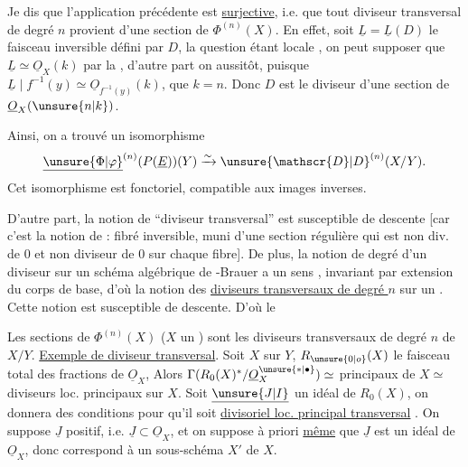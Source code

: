 Je dis que l'application précédente est \uline{surjective}, i.e. que tout diviseur transversal  de degré $n$ provient d'une section de $\Phi^{(n)}(X)$. En effet, soit $\underline{L}=\underline{L}(D)$ le faisceau inversible défini par
$D$,  la question étant locale , on peut supposer que $\underline{L}\simeq\underline{O}_X(k)$ par la , d'autre part on  aussitôt, puisque $\underline{L}\mid f^{-1}(y)\simeq\underline{O}_{f^{-1}(y)}(k)$, que $k=n$. Donc $D$ est le diviseur d'une section de $\underline{O}_X(\unsure{n|k})$.

Ainsi, on a  trouvé un isomorphisme 
\[
\underline{\unsure{\Phi|\varphi}}^{(n)}(P(\underline{E}))(Y)\xrightarrow{\sim}\unsure{\mathscr{D}|D}^{(n)}(X/Y).
\]
Cet isomorphisme est fonctoriel, compatible aux images inverses.

D'autre part, la notion de ``diviseur  transversal'' est susceptible de descente [car c'est la notion de : fibré inversible, muni d'une section régulière qui est non div. de $0$ et non diviseur de $0$ sur chaque fibre]. De plus, la notion de degré d'un diviseur sur un schéma algébrique de -Brauer a un sens , invariant par extension du corps de base, d'où la notion des \uline{diviseurs  transversaux de degré $n$} sur un . Cette notion est susceptible de descente. D'où le

\uline{} Les sections de $\Phi^{(n)}(X)$ ($X$ un ) sont les diviseurs  transversaux de degré $n$ de $X/Y$.
\uline{Exemple de diviseur transversal}. Soit $X$  sur $Y$,  $R_{\unsure{0|o}}(X)$ le faisceau total des fractions de $\underline{O}_X$,  Alors $\Gamma(R_0(X)^*/\underline{O}_X^{\unsure{*|\bullet}})\simeq$      principaux de $X\simeq$ diviseurs loc. principaux sur $X$. Soit $\underline{\unsure{J|I}}$ un idéal de $R_0(X)$, on donnera des conditions pour qu'il soit  \uline{divisoriel loc. principal transversal} \deleted{$\unsure{\xi}$}. On suppose $\underline{J}$ positif, i.e. $\underline{J}\subset\underline{O}_X$, et on suppose à priori \uline{même} que $\underline{J}$ est un idéal de $\underline{O}_X$, \deleted{$\unsure{\xi}$} donc correspond à un sous-schéma $X'$ de $X$.

